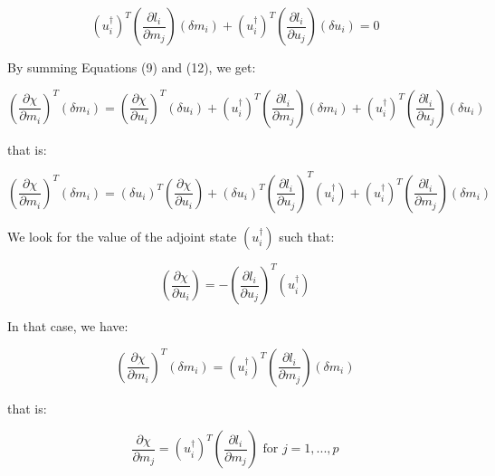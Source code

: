 \documentclass{article}
\begin{document}
\begin{equation}
	\left( u_i^{\dagger} \right) ^{T} \left( \frac{\partial l_i}{\partial m_j} \right) \left( \delta m_i \right) + \left( u_i^{\dagger} \right) ^{T} \left( \frac{\partial l_i}{\partial u_j} \right) \left( \delta u_i \right) = 0
\end{equation}

By summing Equations (9) and (12), we get:

\begin{equation}
	\left( \frac{\partial \chi}{\partial m_i} \right) ^{T} \left( \delta m_i \right) = \left( \frac{\partial \chi}{\partial u_i} \right) ^{T} \left( \delta u_i \right) + \left( u_i^{\dagger} \right) ^{T} \left( \frac{\partial l_i}{\partial m_j} \right) \left( \delta m_i \right) + \left( u_i^{\dagger} \right) ^{T} \left( \frac{\partial l_i}{\partial u_j} \right) \left( \delta u_i \right)
\end{equation}

that is:

\begin{equation}
	\left( \frac{\partial \chi}{\partial m_i} \right) ^{T} \left( \delta m_i \right) = \left( \delta u_i \right) ^{T} \left( \frac{\partial \chi}{\partial u_i} \right) + \left( \delta u_i \right) ^{T} \left( \frac{\partial l_i}{\partial u_j} \right) ^{T} \left( u_i^{\dagger} \right) + \left( u_i^{\dagger} \right) ^{T} \left( \frac{\partial l_i}{\partial m_j} \right) \left( \delta m_i \right)
\end{equation}

We look for the value of the adjoint state $\left( u_i^{\dagger} \right)$ such that:

\begin{equation}
	\left( \frac{\partial \chi}{\partial u_i} \right) = - \left( \frac{\partial l_i}{\partial u_j} \right) ^{T} \left( u_i^{\dagger} \right)
\end{equation}

In that case, we have:

\begin{equation}
	\left( \frac{\partial \chi}{\partial m_i} \right) ^{T} \left( \delta m_i \right) = \left( u_i^{\dagger} \right) ^{T} \left( \frac{\partial l_i}{\partial m_j} \right) \left( \delta m_i \right)
\end{equation}

that is:

\begin{equation}
	\frac{\partial \chi}{\partial m_j} = \left( u_i^{\dagger} \right) ^{T} \left( \frac{\partial l_i}{\partial m_j} \right) \text{ for } j = 1, ... , p
\end{equation}
\end{document}

